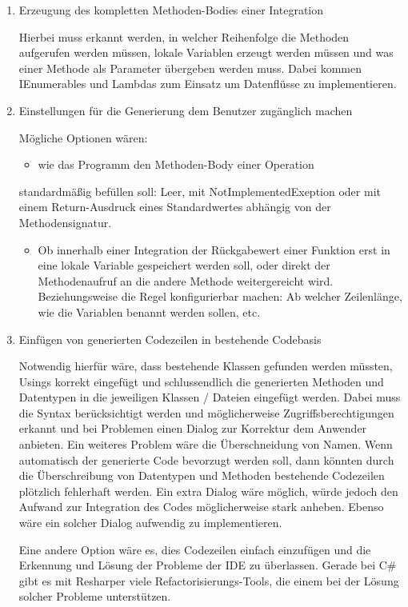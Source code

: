 \begin{enumerate}
\item Erzeugung des kompletten Methoden-Bodies einer Integration

Hierbei muss erkannt werden, in welcher Reihenfolge die Methoden aufgerufen
werden müssen, lokale Variablen erzeugt werden müssen und was einer Methode als Parameter
übergeben werden muss. Dabei kommen IEnumerables und Lambdas zum Einsatz um
Datenflüsse zu implementieren.

\item Einstellungen für die Generierung dem Benutzer zugänglich machen

Mögliche Optionen wären:
\begin{itemize}
\item wie das Programm den Methoden-Body einer Operation
\end{itemize}
standardmäßig befüllen soll: Leer, mit NotImplementedExeption oder mit einem
Return-Ausdruck eines Standardwertes abhängig von der Methodensignatur.
\begin{itemize}
\item Ob innerhalb einer Integration der Rückgabewert einer Funktion erst in eine
lokale Variable gespeichert werden soll, oder direkt der Methodenaufruf an die
andere Methode weitergereicht wird. Beziehungsweise die Regel konfigurierbar
machen: Ab welcher Zeilenlänge, wie die Variablen benannt werden sollen, etc.
\end{itemize}

\item Einfügen von generierten Codezeilen in bestehende Codebasis

Notwendig hierfür wäre, dass bestehende Klassen gefunden werden müssten, Usings korrekt
eingefügt und schlussendlich die generierten Methoden und Datentypen in die
jeweiligen Klassen / Dateien eingefügt werden. Dabei muss die Syntax
berücksichtigt werden und möglicherweise Zugriffsberechtigungen erkannt und bei
Problemen einen Dialog zur Korrektur dem Anwender anbieten. Ein weiteres Problem
wäre die Überschneidung von Namen. Wenn automatisch der generierte Code bevorzugt
  werden soll, dann könnten durch die Überschreibung von Datentypen und Methoden
  bestehende Codezeilen plötzlich fehlerhaft werden. Ein extra Dialog wäre
  möglich, würde jedoch den Aufwand zur Integration des Codes möglicherweise stark
  anheben. Ebenso wäre ein solcher Dialog aufwendig zu implementieren.
 
  Eine andere Option wäre es, dies Codezeilen einfach einzufügen und die Erkennung und Lösung der
  Probleme der IDE zu überlassen. Gerade bei C\# gibt es mit Resharper viele
  Refactorisierungs-Tools, die einem bei der Lösung solcher Probleme unterstützen.
\end{enumerate}



